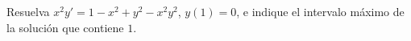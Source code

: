 Resuelva $x^2y'=1-x^2+y^2-x^2y^2$, $y(1)=0$, e indique el intervalo máximo de la solución que contiene $1$.

